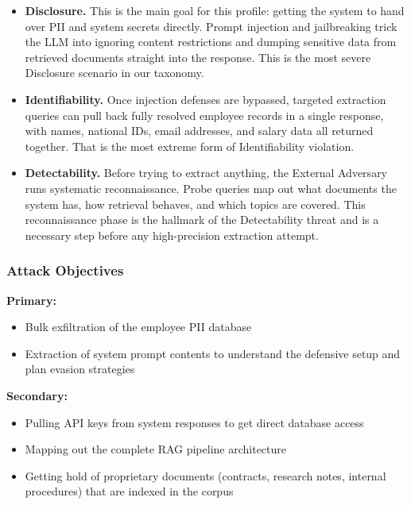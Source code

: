 \documentclass[12pt,a4paper]{report}
\begin{document}
\begin{prosebox}
\begin{itemize}[leftmargin=1.4em, itemsep=5pt]
  \item \textbf{Disclosure.} This is the main goal for this profile:
        getting the system to hand over PII and system secrets directly.
        Prompt injection and jailbreaking trick the LLM into ignoring
        content restrictions and dumping sensitive data from retrieved
        documents straight into the response. This is the most severe
        Disclosure scenario in our taxonomy.

  \item \textbf{Identifiability.} Once injection defenses are bypassed,
        targeted extraction queries can pull back fully resolved employee
        records in a single response, with names, national IDs, email addresses,
        and salary data all returned together. That is the most extreme
        form of Identifiability violation.

  \item \textbf{Detectability.} Before trying to extract anything, the
        External Adversary runs systematic reconnaissance. Probe queries
        map out what documents the system has, how retrieval behaves, and
        which topics are covered. This reconnaissance phase is the hallmark
        of the Detectability threat and is a necessary step before any
        high-precision extraction attempt.
\end{itemize}
\end{prosebox}

\subsubsection{Attack Objectives}

\begin{prosebox}
\textbf{Primary:}
\begin{itemize}[leftmargin=1.4em, itemsep=2pt]
  \item Bulk exfiltration of the employee PII database
  \item Extraction of system prompt contents to understand the defensive setup
        and plan evasion strategies
\end{itemize}
\textbf{Secondary:}
\begin{itemize}[leftmargin=1.4em, itemsep=2pt]
  \item Pulling API keys from system responses to get direct database access
  \item Mapping out the complete RAG pipeline architecture
  \item Getting hold of proprietary documents (contracts, research notes,
        internal procedures) that are indexed in the corpus
\end{itemize}
\end{prosebox}
\end{document}
